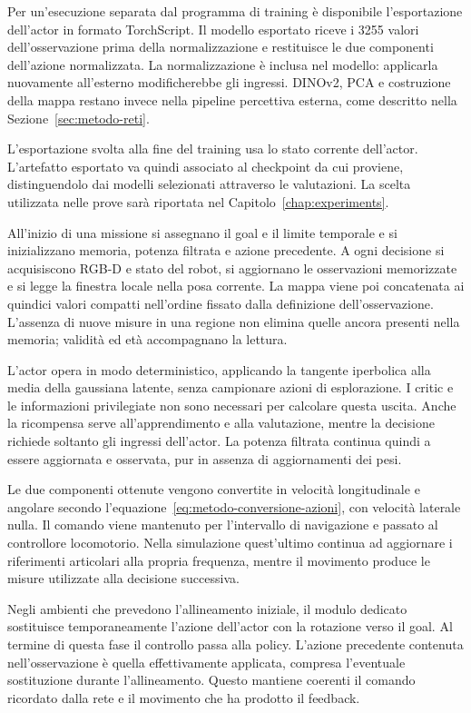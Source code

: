 Per un'esecuzione separata dal programma di training è disponibile l'esportazione dell'actor in formato TorchScript. Il modello esportato riceve i 3255 valori dell'osservazione prima della normalizzazione e restituisce le due componenti dell'azione normalizzata. La normalizzazione è inclusa nel modello: applicarla nuovamente all'esterno modificherebbe gli ingressi. DINOv2, PCA e costruzione della mappa restano invece nella pipeline percettiva esterna, come descritto nella Sezione~\ref{sec:metodo-reti}.

L'esportazione svolta alla fine del training usa lo stato corrente dell'actor. L'artefatto esportato va quindi associato al checkpoint da cui proviene, distinguendolo dai modelli selezionati attraverso le valutazioni. La scelta utilizzata nelle prove sarà riportata nel Capitolo~\ref{chap:experiments}.

All'inizio di una missione si assegnano il goal e il limite temporale e si inizializzano memoria, potenza filtrata e azione precedente. A ogni decisione si acquisiscono RGB-D e stato del robot, si aggiornano le osservazioni memorizzate e si legge la finestra locale nella posa corrente. La mappa viene poi concatenata ai quindici valori compatti nell'ordine fissato dalla definizione dell'osservazione. L'assenza di nuove misure in una regione non elimina quelle ancora presenti nella memoria; validità ed età accompagnano la lettura.

L'actor opera in modo deterministico, applicando la tangente iperbolica alla media della gaussiana latente, senza campionare azioni di esplorazione. I critic e le informazioni privilegiate non sono necessari per calcolare questa uscita. Anche la ricompensa serve all'apprendimento e alla valutazione, mentre la decisione richiede soltanto gli ingressi dell'actor. La potenza filtrata continua quindi a essere aggiornata e osservata, pur in assenza di aggiornamenti dei pesi.

Le due componenti ottenute vengono convertite in velocità longitudinale e angolare secondo l'equazione~\eqref{eq:metodo-conversione-azioni}, con velocità laterale nulla. Il comando viene mantenuto per l'intervallo di navigazione e passato al controllore locomotorio. Nella simulazione quest'ultimo continua ad aggiornare i riferimenti articolari alla propria frequenza, mentre il movimento produce le misure utilizzate alla decisione successiva.

Negli ambienti che prevedono l'allineamento iniziale, il modulo dedicato sostituisce temporaneamente l'azione dell'actor con la rotazione verso il goal. Al termine di questa fase il controllo passa alla policy. L'azione precedente contenuta nell'osservazione è quella effettivamente applicata, compresa l'eventuale sostituzione durante l'allineamento. Questo mantiene coerenti il comando ricordato dalla rete e il movimento che ha prodotto il feedback.

